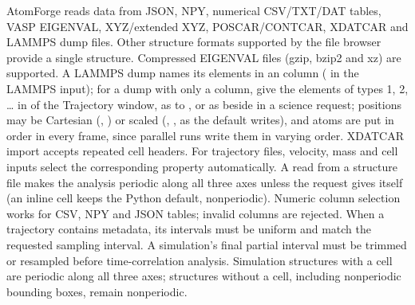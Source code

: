 AtomForge reads data from JSON, NPY, numerical CSV/TXT/DAT tables, VASP EIGENVAL, XYZ/extended XYZ, POSCAR/CONTCAR, XDATCAR and LAMMPS dump files. Other structure formats supported by the file browser provide a single structure. Compressed EIGENVAL files (gzip, bzip2 and xz) are supported. A LAMMPS dump names its elements in an  column ( in the LAMMPS input); for a dump with only a  column, give the elements of types 1, 2, \ldots{} in  of the Trajectory window, as  to , or as  beside  in a science request; positions may be Cartesian (, ) or scaled (, , as the default  writes), and atoms are put in  order in every frame, since parallel runs write them in varying order. XDATCAR import accepts repeated cell headers. For trajectory files, velocity, mass and cell inputs select the corresponding property automatically. A  read from a structure file makes the analysis periodic along all three axes unless the request gives  itself (an inline cell keeps the Python default, nonperiodic). Numeric column selection works for CSV, NPY and JSON tables; invalid columns are rejected. When a trajectory contains  metadata, its intervals must be uniform and match the requested sampling interval. A simulation's final partial interval must be trimmed or resampled before time-correlation analysis. Simulation structures with a cell are periodic along all three axes; structures without a cell, including nonperiodic bounding boxes, remain nonperiodic.

